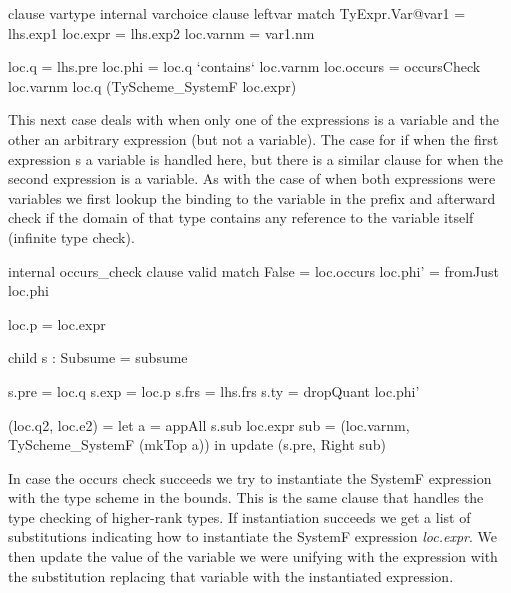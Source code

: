 \begin{code}
                     clause vartype   
                       internal varchoice
                         clause leftvar
                           match TyExpr.Var@var1 = lhs.exp1
                           loc.expr  = lhs.exp2
                           loc.varnm = var1.nm

                           loc.q   = lhs.pre
                           loc.phi = loc.q `contains` loc.varnm
                           loc.occurs = occursCheck loc.varnm loc.q (TyScheme_SystemF loc.expr)
\end{code}
This next case deals with when only one of the expressions is a variable and the other an arbitrary expression (but not a variable). The case for if when the first expression s a variable is handled here, but there is a similar clause for when the second expression is a variable. 
As with the case of when both expressions were variables we first lookup the binding to the variable in the prefix and afterward check if the domain of that type contains any reference to the variable itself (infinite type check).
                           
\begin{code}
                           internal occurs_check
                             clause valid
                               match False = loc.occurs
                               loc.phi' = fromJust loc.phi
                               
                               loc.p = loc.expr
                               
                               child s : Subsume = subsume
                               
                               s.pre = loc.q
                               s.exp = loc.p
                               s.frs = lhs.frs
                               s.ty  = dropQuant loc.phi'
                               
                               (loc.q2, loc.e2) = let a   = appAll s.sub loc.expr
                                                      sub = (loc.varnm, TyScheme_SystemF (mkTop a))
                                                  in update (s.pre, Right sub)
\end{code}
In case the occurs check succeeds we try to instantiate the SystemF expression with the type scheme in the bounds. This is the same clause that handles the type checking of higher-rank types. If instantiation succeeds we get a list of substitutions indicating how to instantiate the SystemF expression \emph{loc.expr}.
We then update the value of the variable we were unifying with the expression with the substitution replacing that variable with the instantiated expression.

